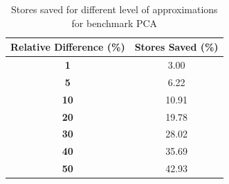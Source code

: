\begin{table}[htbp]
\caption{Stores saved for different level of approximations for benchmark PCA}
	\begin{center}
		\begin{tabular}{|c|c|}
			\hline

			\textbf{Relative Difference (\%)} & \textbf{Stores Saved (\%)}\\
			\hline

			\textbf{1} & 3.00\\
			\hline

			\textbf{5} & 6.22\\
			\hline

			\textbf{10} & 10.91\\
			\hline

			\textbf{20} & 19.78\\
			\hline

			\textbf{30} & 28.02\\
			\hline

			\textbf{40} & 35.69\\
			\hline

			\textbf{50} & 42.93\\
			\hline

		\end{tabular}
	\label{tab:pca_reldiff}
	\end{center}
\end{table}







